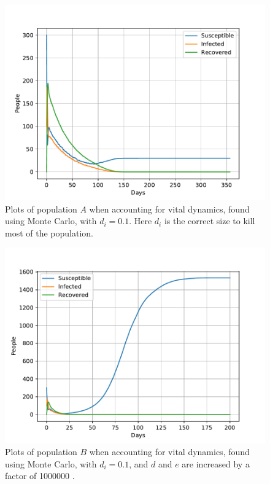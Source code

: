 \documentclass[a4paper]{article}
\begin{document}
	\begin{figure}[!htb]
		\centering 
		\includegraphics[scale=0.56]{../plots/opp_c_k2l_MC.pdf}	
		\caption{Plots of population $A$ when accounting for vital dynamics, found using Monte Carlo, with $d_i=0.1$. Here $d_i$ is the correct size to kill most of the population. }
		\label{opp_c1_MC}
	\end{figure}
	
	\begin{figure}[!htb]
		\centering 
		\includegraphics[scale=0.56]{../plots/opp_c_h_1000000_MC.pdf} %
		\caption{Plots of population $B$  when accounting for vital dynamics, found using Monte Carlo, with $d_i=0.1$, and $d$ and $e$ are increased by a factor of 
			1000000 
			.}
		\label{opp_c2_MC}
	\end{figure}
	
\end{document}
